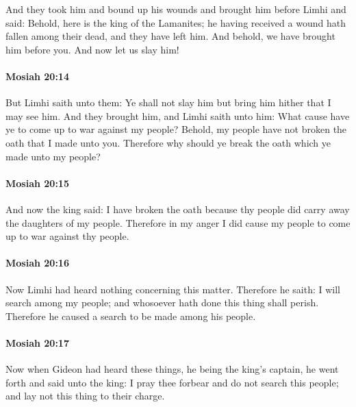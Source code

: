 			And they took him and bound up his wounds
			and brought him before Limhi and said:
			Behold, here is the king of the Lamanites;
			he having received a wound hath fallen among their dead,
			and they have left him.
			And behold, we have brought him before you.
			And now let us slay him!

		\paragraph{Mosiah 20:14} %
			\label{MOSIAH-20-14}

			But Limhi saith unto them:
			Ye shall not slay him but bring him hither that I may see him.
			And they brought him, and Limhi saith unto him:
			What cause have ye to come up to war against my people?
			Behold, my people have not broken the oath that I made unto you.
			Therefore why should ye break the oath which ye made unto my people?

		\paragraph{Mosiah 20:15} %
			\label{MOSIAH-20-15}

			And now the king said:
			I have broken the oath
			because thy people did carry away the daughters of my people.
			Therefore in my anger I did cause my people
			to come up to war against thy people.

		\paragraph{Mosiah 20:16} %
			\label{MOSIAH-20-16}

			Now Limhi had heard nothing concerning this matter.
			Therefore he saith:
			I will search among my people;
			and whosoever hath done this thing shall perish.
			Therefore he caused a search to be made among his people.

		\paragraph{Mosiah 20:17} %
			\label{MOSIAH-20-17}

			Now when Gideon had heard these things,
			he being the king's captain,
			he went forth and said unto the king:
			I pray thee forbear and do not search this people;
			and lay not this thing to their charge.

